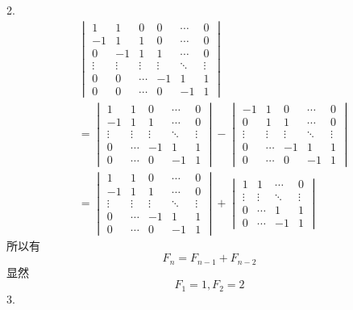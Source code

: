 \documentclass[utf8]{ctexart}
\begin{document}
2.\\
\begin{align*}
	&\begin{vmatrix}
		1&1&0&0&\cdots&0\\
		-1&1&1&0&\cdots&0\\
		0&-1&1&1&\cdots&0\\
		\vdots&\vdots&\vdots&\vdots&\ddots&\vdots\\
		0&0&\cdots&-1&1&1\\
		0&0&\cdots&0&-1&1
	\end{vmatrix}\\
	&=\begin{vmatrix}
		1&1&0&\cdots&0\\
		-1&1&1&\cdots&0\\
		\vdots&\vdots&\vdots&\ddots&\vdots\\
		0&\cdots&-1&1&1\\
		0&\cdots&0&-1&1
	\end{vmatrix}-\begin{vmatrix}
	-1&1&0&\cdots&0\\
	0&1&1&\cdots&0\\
	\vdots&\vdots&\vdots&\ddots&\vdots\\
	0&\cdots&-1&1&1\\
	0&\cdots&0&-1&1
	\end{vmatrix}\\
	&=\begin{vmatrix}
		1&1&0&\cdots&0\\
		-1&1&1&\cdots&0\\
		\vdots&\vdots&\vdots&\ddots&\vdots\\
		0&\cdots&-1&1&1\\
		0&\cdots&0&-1&1
	\end{vmatrix}+\begin{vmatrix}
	1&1&\cdots&0\\
	\vdots&\vdots&\ddots&\vdots\\
	0&\cdots&1&1\\
	0&\cdots&-1&1
	\end{vmatrix}
\end{align*}
所以有
\[F_n=F_{n-1}+F_{n-2}\]
显然
\[F_1=1,F_2=2\]
3.\\
\end{document}
